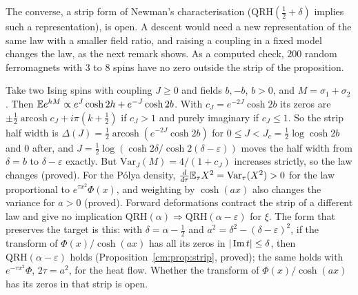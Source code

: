 The converse, a strip form of Newman's characterisation \cite{Newman1976} ($\mathrm{QRH}(\frac12+\delta)$ implies such a representation), is open. A descent would need a new representation of the same law with a smaller field ratio, and raising a coupling in a fixed model changes the law, as the next remark shows. As a computed check, $200$ random ferromagnets with $3$ to $8$ spins have no zero outside the strip of the proposition.

\begin{remark}\label{cm:rem:forward}
Take two Ising spins with coupling $J\ge0$ and fields $b,-b$, $b>0$, and $M=\sigma_1+\sigma_2$. Then $\mathbb{E} e^{hM}\propto e^J\cosh2h+e^{-J}\cosh2b$. With $c_J=e^{-2J}\cosh2b$ its zeros are $\pm\frac12\operatorname{arcosh}c_J+i\pi(k+\frac12)$ if $c_J>1$ and purely imaginary if $c_J\le1$. So the strip half width is $\Delta(J)=\frac12\operatorname{arcosh}(e^{-2J}\cosh2b)$ for $0\le J<J_c=\frac12\log\cosh2b$ and $0$ after, and $J=\frac12\log(\cosh2\delta/\cosh2(\delta-\varepsilon))$ moves the half width from $\delta=b$ to $\delta-\varepsilon$ exactly. But $\mathrm{Var}_J(M)=4/(1+c_J)$ increases strictly, so the law changes (proved). For the P\'olya density, $\frac d{d\tau}\mathbb{E}_\tau X^2=\mathrm{Var}_\tau(X^2)>0$ for the law proportional to $e^{\tau x^2}\Phi(x)$, and weighting by $\cosh(ax)$ also changes the variance for $a>0$ (proved). Forward deformations contract the strip of a different law and give no implication $\mathrm{QRH}(\alpha)\Rightarrow\mathrm{QRH}(\alpha-\varepsilon)$ for $\xi$. The form that preserves the target is this: with $\delta=\alpha-\frac12$ and $a^2=\delta^2-(\delta-\varepsilon)^2$, if the transform of $\Phi(x)/\cosh(ax)$ has all its zeros in $|\operatorname{Im} t|\le\delta$, then $\mathrm{QRH}(\alpha-\varepsilon)$ holds (Proposition~\ref{cm:prop:strip}, proved); the same holds with $e^{-\tau x^2}\Phi$, $2\tau=a^2$, for the heat flow. Whether the transform of $\Phi(x)/\cosh(ax)$ has its zeros in that strip is open.


\end{remark}

